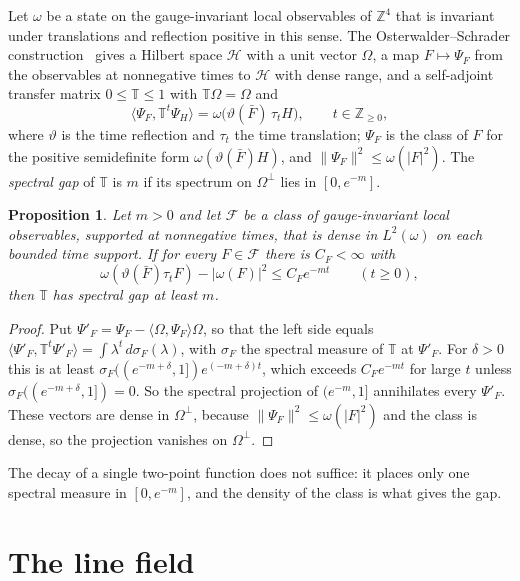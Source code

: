 \documentclass[11pt]{amsart}
\newtheorem{proposition}[theorem]{Proposition}
\theoremstyle{definition}
\theoremstyle{remark}
\numberwithin{equation}{section}
\newcommand{\Z}{\mathbb{Z}}
\newcommand{\ip}[2]{\langle #1,#2\rangle}
\begin{document}
Let $\omega$ be a state on the gauge-invariant local observables of $\Z^4$
that is invariant under translations and reflection positive in this sense.
The Osterwalder--Schrader construction~\cite{OS73,OS75,OSei78} gives a
Hilbert space $\mathcal H$ with a unit vector $\Omega$, a map $F\mapsto\Psi_F$
from the observables at nonnegative times to $\mathcal H$ with dense range,
and a self-adjoint transfer matrix $0\le\mathbb T\le1$ with $\mathbb T\Omega=
\Omega$ and
\[
\ip{\Psi_F}{\mathbb T^t\Psi_H}=\omega\bigl(\vartheta(\bar F)\,\tau_tH\bigr),
\qquad t\in\Z_{\ge0},
\]
where $\vartheta$ is the time reflection and $\tau_t$ the time translation;
$\Psi_F$ is the class of $F$ for the positive semidefinite form
$\omega(\vartheta(\bar F)H)$, and $\|\Psi_F\|^2\le\omega(|F|^2)$. The
\emph{spectral gap} of $\mathbb T$ is $m$ if its spectrum on $\Omega^\perp$
lies in $[0,e^{-m}]$.

\begin{proposition}\label{prop:gapdecay}
Let $m>0$ and let $\mathcal F$ be a class of gauge-invariant local
observables, supported at nonnegative times, that is dense in $L^2(\omega)$
on each bounded time support. If for every $F\in\mathcal F$ there is
$C_F<\infty$ with
\[
\omega(\vartheta(\bar F)\tau_tF)-|\omega(F)|^2\le C_Fe^{-mt}\qquad(t\ge0),
\]
then $\mathbb T$ has spectral gap at least $m$.
\end{proposition}

\begin{proof}
Put $\Psi'_F=\Psi_F-\ip\Omega{\Psi_F}\Omega$, so that the left side equals
$\ip{\Psi'_F}{\mathbb T^t\Psi'_F}=\int\lambda^t\,d\sigma_F(\lambda)$, with
$\sigma_F$ the spectral measure of $\mathbb T$ at $\Psi'_F$. For $\delta>0$
this is at least $\sigma_F((e^{-m+\delta},1])e^{(-m+\delta)t}$, which exceeds
$C_Fe^{-mt}$ for large $t$ unless $\sigma_F((e^{-m+\delta},1])=0$. So the
spectral projection of $(e^{-m},1]$ annihilates every $\Psi'_F$. These vectors
are dense in $\Omega^\perp$, because $\|\Psi_F\|^2\le\omega(|F|^2)$ and the
class is dense, so the projection vanishes on $\Omega^\perp$.
\end{proof}

The decay of a single two-point function does not suffice: it places only
one spectral measure in $[0,e^{-m}]$, and the density of the class is what
gives the gap.

\section{The line field}\label{sec:linefield}
\end{document}

